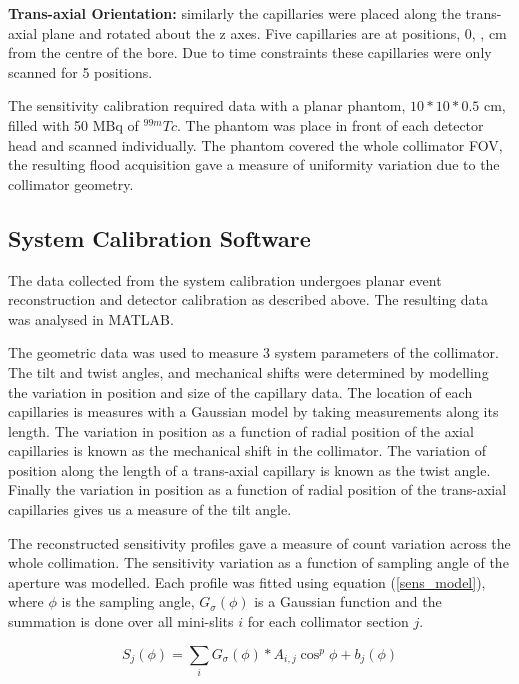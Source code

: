 \textbf{Trans-axial Orientation:} similarly the capillaries were placed along the trans-axial plane and rotated about the z axes. Five capillaries are at positions, 0, ,  cm from the centre of the bore. Due to time constraints these capillaries were only scanned for 5 positions.

The sensitivity calibration required data with a planar phantom, $10 * 10 * 0.5$ cm, filled with 50 MBq of $^{99m}Tc$. The phantom was place in front of each detector head and scanned individually. The phantom covered the whole collimator \acrshort{FOV}, the resulting flood acquisition gave a measure of uniformity variation due to the collimator geometry. 

\subsection{System Calibration Software}
The data collected from the system calibration undergoes planar event reconstruction and detector calibration as described above. The resulting data was analysed in MATLAB.

The geometric data was used to measure 3 system parameters of the collimator. The tilt and twist angles, and mechanical shifts were determined by modelling the variation in position and size of the capillary data. The location of each capillaries is measures with a Gaussian model by taking measurements along its length. The variation in position as a function of radial position of the axial capillaries is known as the mechanical shift in the collimator. The variation of position along the length of a trans-axial capillary is known as the twist angle. Finally the variation in position as a function of radial position of the trans-axial capillaries gives us a measure of the tilt angle.

The reconstructed sensitivity profiles gave a measure of count variation across the whole collimation. The sensitivity variation as a function of sampling angle of the aperture was modelled. Each profile was fitted using equation (\ref{sens_model}), where $\phi$ is the sampling angle, $G_{\sigma}(\phi)$ is a Gaussian function and the summation is done over all mini-slits $i$ for each collimator section $j$. 

\begin{equation}
\label{sens_model}
S_{j}(\phi) = \sum_{i} G_{\sigma}(\phi) \ast A_{i,j} \cos^{p}{\phi} + b_{j}(\phi)
\end{equation}

